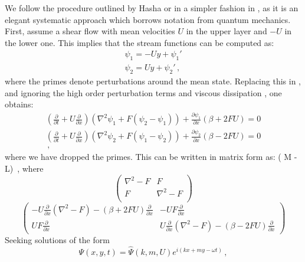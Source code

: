 We follow the procedure outlined by Hasha or in a simpler
fashion in , as it is an elegant systematic approach
which borrows notation from quantum mechanics. First, assume a shear flow
with mean velocities $U$ in the upper layer and $-U$ in the lower one.
This implies that the stream functions can be computed as:
\begin{eqnarray}
\psi_1 = -U y + \psi_1' \nonumber \\
\psi_2 =  U y + \psi_2'
\label{psi_base}
\,,
\end{eqnarray}
where the primes denote perturbations around the mean state. Replacing this in , and ignoring the high order perturbation terms and viscous dissipation , one obtains:
\begin{eqnarray}
\left(\frac{\partial}{\partial t}+U \frac{\partial}{\partial x}\right)\left(\nabla^2 \psi_1 + F(\psi_2-\psi_1)\right) +\frac{\partial \psi_1}{\partial x}(\beta + 2FU) = 0 \nonumber \\
\left(\frac{\partial}{\partial t}+U \frac{\partial}{\partial x}\right)\left(\nabla^2 \psi_2 + F(\psi_1-\psi_2)\right) +\frac{\partial \psi_2}{\partial x}(\beta - 2FU) = 0 \nonumber \\
\label{model_eq}
\,,
\end{eqnarray}
where we have dropped the primes. This can be written in matrix form as:
\beq
\left( M - L\right) 
\,,
where
\begin{equation}
\begin{pmatrix}
  \nabla ^2 - F & F \\
  F & \nabla^2 - F \\
\end{pmatrix}
\label{Mmatrix}
\end{equation}
\begin{equation}
\begin{pmatrix}
  -U \frac{\partial}{\partial x}(\nabla ^2-F)-(\beta+2FU)\frac{\partial}{\partial x}
   & -U F \frac{\partial}{\partial x} \\
   U F \frac{\partial}{\partial x}
   & U \frac{\partial}{\partial x}(\nabla ^2-F)-(\beta-2FU)\frac{\partial}{\partial x}
\end{pmatrix}
\label{Mmatrix2}
\end{equation}
Seeking solutions of the form
\begin{equation}
\Psi (x,y,t)=\hat{\Psi} (k,m,U) e^{i(kx+my-\omega t)}
\,,
\label{PRT}
\end{equation}
